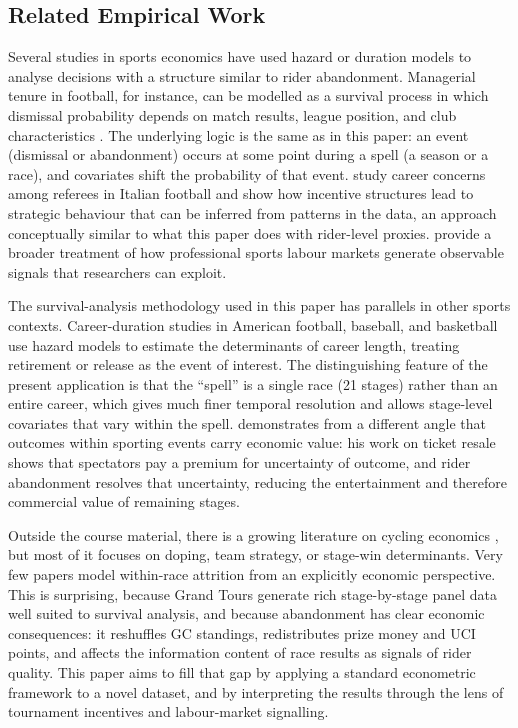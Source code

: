 \subsection{Related Empirical Work}

Several studies in sports economics have used hazard or duration models to analyse decisions with a structure similar to rider abandonment. Managerial tenure in football, for instance, can be modelled as a survival process in which dismissal probability depends on match results, league position, and club characteristics \parencite{boeri2008italianjob}. The underlying logic is the same as in this paper: an event (dismissal or abandonment) occurs at some point during a spell (a season or a race), and covariates shift the probability of that event. \textcite{boeri2008italianjob} study career concerns among referees in Italian football and show how incentive structures lead to strategic behaviour that can be inferred from patterns in the data, an approach conceptually similar to what this paper does with rider-level proxies. \textcite{rosen2001labourmarkets} provide a broader treatment of how professional sports labour markets generate observable signals that researchers can exploit.

The survival-analysis methodology used in this paper has parallels in other sports contexts. Career-duration studies in American football, baseball, and basketball use hazard models to estimate the determinants of career length, treating retirement or release as the event of interest. The distinguishing feature of the present application is that the ``spell'' is a single race (21 stages) rather than an entire career, which gives much finer temporal resolution and allows stage-level covariates that vary within the spell. \textcite{courty2003ticketresale} demonstrates from a different angle that outcomes within sporting events carry economic value: his work on ticket resale shows that spectators pay a premium for uncertainty of outcome, and rider abandonment resolves that uncertainty, reducing the entertainment and therefore commercial value of remaining stages.

Outside the course material, there is a growing literature on cycling economics \parencite{torgler2007cycling}, but most of it focuses on doping, team strategy, or stage-win determinants. Very few papers model within-race attrition from an explicitly economic perspective. This is surprising, because Grand Tours generate rich stage-by-stage panel data well suited to survival analysis, and because abandonment has clear economic consequences: it reshuffles GC standings, redistributes prize money and UCI points, and affects the information content of race results as signals of rider quality. This paper aims to fill that gap by applying a standard econometric framework to a novel dataset, and by interpreting the results through the lens of tournament incentives and labour-market signalling.

